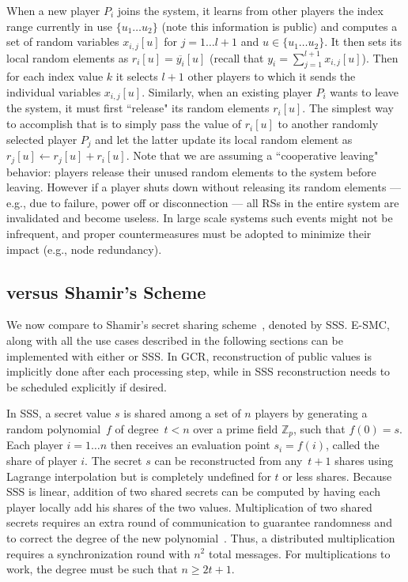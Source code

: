 \documentclass{sig-alternate}
\begin{document}
When a new player $P_i$  joins the system, it learns from other players the index range currently in use $ \{u_1 \ldots u_2\}$ (note this information is public) and computes a set of random variables $x_{i,j}[u]$ for $j=1 \ldots l+1$ and $u \in \{u_1 \ldots u_2\}$. It then sets its local random elements as $r_i[u] = \overline{y_i}[u]$ (recall that $y_i = \sum_{j=1}^{l+1}{x_{i,j}[u]}$). Then for each index value $k$ it selects $l+1$ other players to which it sends the individual variables $x_{i,j}[u]$. 
Similarly, when an existing player $P_i$  wants to leave the system, it must first ``release" its random elements  $r_i[u]$. 
The simplest way to accomplish that is to simply pass the value of $r_i[u]$ to another randomly selected player $P_j$ and let the latter update its local random element as $r_j[u] \leftarrow r_j[u] + r_i[u]$. 
Note that we are assuming a ``cooperative leaving" behavior: players release their unused random elements to the system before leaving. 
However if a player shuts down without releasing its random elements --- e.g., due to failure, power off or disconnection ---  all RSs in the entire system are invalidated and become useless. In large scale systems such events might not be infrequent, and proper countermeasures must be adopted to minimize their impact (e.g., node redundancy). 

\subsection{\ata versus Shamir's Scheme}\label{sec:comparison-ata-sss}

We now compare \ata to Shamir's secret sharing scheme~\cite{shamir79}, denoted by SSS.
E-SMC, along with all the use cases described in the following sections 
can be implemented with either \ata or SSS. 
In GCR, reconstruction of public values is implicitly done after each processing step, while in SSS reconstruction needs to be scheduled explicitly if desired.

In SSS, a secret value $s$ is shared among a set of $n$ players by generating a random
polynomial~$f$ of degree~$t<n$ over a prime field $\mathbb{Z}_p$, such that $f(0)=s$.  Each player $i=1\ldots n$ then receives an evaluation
point $s_i=f(i)$, called the share of player $i$. The secret $s$ can be reconstructed from any~$t+1$ shares using Lagrange interpolation but is completely undefined for
$t$ or less shares. 
Because SSS is linear, addition of two shared secrets can be computed by having each player locally add his shares of the two values.
Multiplication of two shared secrets requires an extra round of communication to guarantee randomness and to correct the degree of the
new polynomial~\cite{gennaro1998sva}. Thus, a distributed multiplication requires a synchronization round with $n^2$ total messages. For multiplications to work, the
degree must be such that $n \geq 2t+1$.
\end{document}
